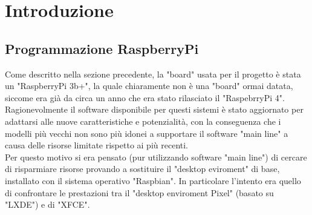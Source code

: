 \chapter{Introduzione}\label{cap:Programmazione del supporto hardware del progetto}

\section{Programmazione RaspberryPi}\label{sez:Programmazione RaspberryPi}

Come descritto nella sezione precedente, la "board" usata per il progetto è stata un "RaspberryPi 3b+", la quale chiaramente non è una "board" ormai datata, siccome era già da circa un anno che era stato rilasciato il "RaspebrryPi 4". Ragionevolmente il software disponibile per questi sistemi è stato aggiornato per adattarsi alle nuove caratteristiche e potenzialità, con la conseguenza che i modelli più vecchi non sono più idonei a supportare il software "main line" a causa delle risorse limitate rispetto ai più recenti.\\
Per questo motivo si era pensato (pur utilizzando software "main line") di cercare di risparmiare risorse provando a sostituire il "desktop eviroment" di base, installato con il sistema operativo "Raspbian". In particolare l'intento era quello di confrontare le prestazioni tra il "desktop enviroment Pixel" (basato su "LXDE") e di "XFCE".  

